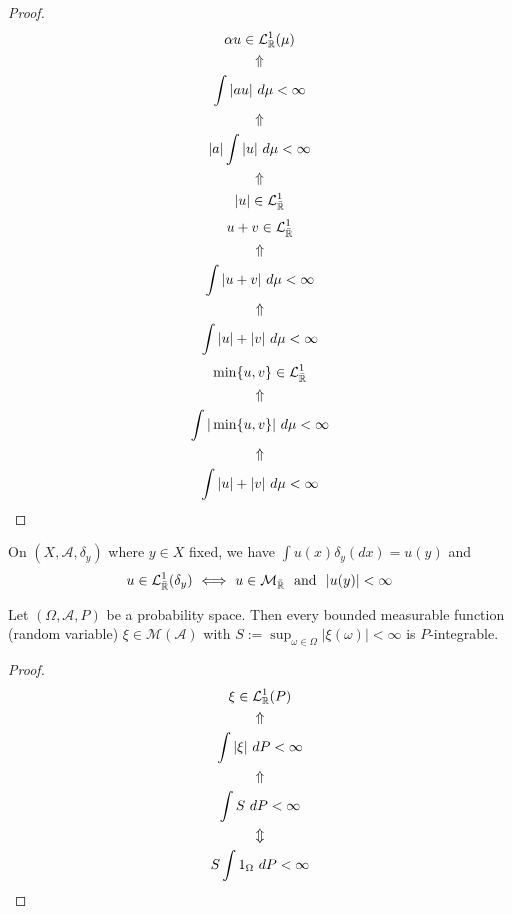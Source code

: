 \begin{proof}
\begin{gather*}
\alpha u \in  \mathcal{L}_{\Bbb{R}}^1(\mu ) \\
\Uparrow  \\
\int  |au|\  d\mu <\infty \\
\Uparrow  \\
|a|\int  |u|\  d\mu <\infty  \\
\Uparrow  \\
|u| \in \mathcal{L}_{\bar{\Bbb{R}}}^{1}
\end{gather*}
\begin{gather*}
u+v\in \mathcal{L}_{\bar{\Bbb{R}}}^{1} \\
\Uparrow  \\
\int  |u+v|\  d\mu  <\infty \\
\Uparrow  \\
\int  |u|+|v|\  d\mu  <\infty 
\end{gather*}
\begin{gather*}
\min\{u,v\} \in \mathcal{L}_{\bar{\Bbb{R}}}^{1} \\
\Uparrow  \\
\int  |\min\{u,v\}|\  d\mu <\infty  \\
\Uparrow  \\
\int  |u|+|v|\  d\mu  <\infty 
\end{gather*}
\end{proof}

\begin{prop}
On \((X,\mathcal{A},\delta _{y})\) where \(y\in X\) fixed, we have \(\int u(x)\delta _{y}(dx)=u(y)\) and
\[
u\in \mathcal{L}_{\bar{\Bbb{R}}}^1(\delta _{y})\  \Longleftrightarrow \  u\in \mathcal{M}_{\bar{\Bbb{R}}}\   \text{ and }\  |u(y)|<\infty 
\]
\end{prop}

\begin{prop}
Let \((\Omega ,\mathcal{A},P)\) be a probability space. Then every bounded measurable function (random variable) \(\xi \in \mathcal{M}(\mathcal{A})\) with \(S:=\sup_{\omega \in \Omega }|\xi (\omega )|<\infty \) is \(P\)-integrable.
\end{prop}

\begin{proof}
\begin{gather*}
\xi \in \mathcal{L}_{\Bbb{R}}^1(P) \\
\Uparrow  \\
\int  |\xi |\  dP <\infty  \\
\Uparrow  \\
\int  S\  dP <\infty  \\
\Updownarrow \\
S\int  1_\Omega \  dP <\infty 
\end{gather*}
\end{proof}

